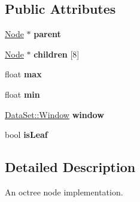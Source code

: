 \subsection*{\-Public \-Attributes}
\begin{DoxyCompactItemize}
\item 
\hypertarget{class_verdi_1_1_min_max_octree_1_1_node_a247dff58a114f2753f40ed43120ae64a}{\hyperlink{class_verdi_1_1_min_max_octree_1_1_node}{\-Node} $\ast$ {\bfseries parent}}\label{class_verdi_1_1_min_max_octree_1_1_node_a247dff58a114f2753f40ed43120ae64a}

\item 
\hypertarget{class_verdi_1_1_min_max_octree_1_1_node_abc86d0b5612b0ddf6ef8f4a41c0debfe}{\hyperlink{class_verdi_1_1_min_max_octree_1_1_node}{\-Node} $\ast$ {\bfseries children} \mbox{[}8\mbox{]}}\label{class_verdi_1_1_min_max_octree_1_1_node_abc86d0b5612b0ddf6ef8f4a41c0debfe}

\item 
\hypertarget{class_verdi_1_1_min_max_octree_1_1_node_adb2c0d5c42a8b4c09a426eb052a025fa}{float {\bfseries max}}\label{class_verdi_1_1_min_max_octree_1_1_node_adb2c0d5c42a8b4c09a426eb052a025fa}

\item 
\hypertarget{class_verdi_1_1_min_max_octree_1_1_node_aaae010ff1e38a79e7637529a1a0c8827}{float {\bfseries min}}\label{class_verdi_1_1_min_max_octree_1_1_node_aaae010ff1e38a79e7637529a1a0c8827}

\item 
\hypertarget{class_verdi_1_1_min_max_octree_1_1_node_a568afb77b2fe8ff7c0d314c0606d5a99}{\hyperlink{struct_verdi_1_1_data_set_1_1_window}{\-Data\-Set\-::\-Window} {\bfseries window}}\label{class_verdi_1_1_min_max_octree_1_1_node_a568afb77b2fe8ff7c0d314c0606d5a99}

\item 
\hypertarget{class_verdi_1_1_min_max_octree_1_1_node_a7f26e7d217db180377f76638b36bf740}{bool {\bfseries is\-Leaf}}\label{class_verdi_1_1_min_max_octree_1_1_node_a7f26e7d217db180377f76638b36bf740}

\end{DoxyCompactItemize}


\subsection{\-Detailed \-Description}
\-An octree node implementation. 

